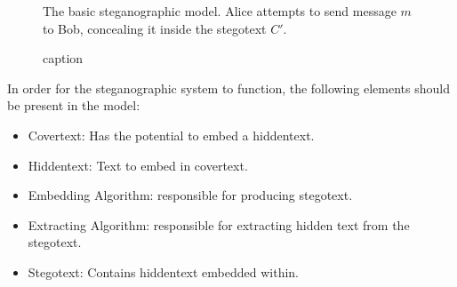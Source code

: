 \documentclass[11pt]{article}
\newcommand\stgenc{\algo{SE}}
\newcommand\stgdec{\algo{SD}}
\begin{document}
\begin{figure}[htbp]
  \centering
  \begin{minipage}[t]{.8\linewidth}
    \makebox[\textwidth][c]{
      
    }
    \centering
    \caption{The basic steganographic model. Alice attempts to send
    message $m$ to Bob, concealing it inside the stegotext $C'$.}
    \label{fig:model}
  \end{minipage}
\end{figure}

\begin{figure}[htbp]
  \label{fig:label}
  \centering
  \begin{minipage}[t]{.8\linewidth}
    \centering
    \caption{caption}
  \end{minipage}
\end{figure}

In order for the steganographic system to function, the following
elements should be present in the model:
\begin{itemize}[noitemsep]
  \item[$C$] Covertext: Has the potential to embed a hiddentext.
  \item[$m$ \& $m'$] Hiddentext: Text to embed in covertext.
  \item[$\stgenc$] Embedding  Algorithm: responsible for producing stegotext.
  \item[$\stgdec$] Extracting Algorithm: responsible for extracting
    hidden text from the stegotext.
  \item[$C'$] Stegotext: Contains hiddentext embedded within.
\end{itemize}
\end{document}

